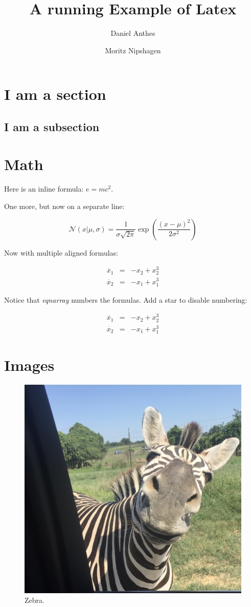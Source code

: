 \documentclass[12pt]{scrarticle}
\title{A running Example of Latex}
\author{Daniel Anthes \and Moritz Nipshagen}
\date{} %
\begin{document}
\maketitle

\begin{abstract}
    \lipsum[3]
\end{abstract}

\section{I am a section}

\lipsum[1]

\subsection{I am a subsection}

\lipsum[2]

\section{Math}

Here is an inline formula: $e = mc^2$.

One more, but now on a separate line:

$$
\mathcal{N}(x|\mu, \sigma) = \frac{1}{\sigma \sqrt{2\pi}}\exp \left({\frac{(x - \mu)^2}{2\sigma^2}}\right)
$$

Now with multiple aligned formulas:

\begin{eqnarray}
\dot{x_1} &=& -x_2 + x_{2}^3\\
\dot{x_2} &=& -x_1 + x_{1}^3
\end{eqnarray}

Notice that \textit{eqnarray} numbers the formulas. Add a star to disable numbering:


\begin{eqnarray*}
\dot{x_1} &=& -x_2 + x_{2}^3\\
\dot{x_2} &=& -x_1 + x_{1}^3
\end{eqnarray*}

\section{Images}

\begin{figure}[h!]
    \centering
    \includegraphics[width=.3\linewidth]{Running-Example/zebra.jpeg}
    \caption{Zebra.}
    \label{fig:examplefig}
\end{figure}
\end{document}
